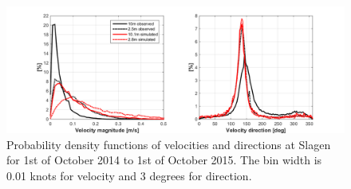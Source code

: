 \begin{figure}[htb]
	\centerline{
		\includegraphics*[trim=2cm 0cm 2cm 0cm,clip=true,width=\textwidth]{Figurer/Slagen_pdf} }
	\caption{\small Probability density functions of velocities and directions at Slagen for 1st of October 2014 to 1st of October 2015. The bin width is 0.01 knots for velocity and 3 degrees for direction.}
	\label{fig:Slagen-pdf}
\end{figure}

